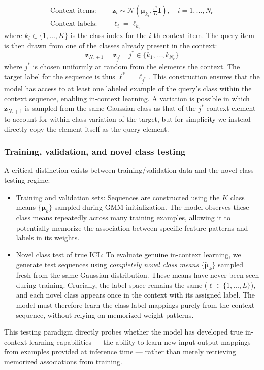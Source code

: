 \documentclass[%
reprint,
superscriptaddress,
amsmath,amssymb,
aps,
]{revtex4-2}
\newcommand{\bz}{\mathbf{z}}       %
\newcommand{\bmu}{\boldsymbol{\mu}}       %
\begin{document}
\begin{onecolumngrid}
		\begin{align}
			\text{Context items: } &\quad \bz_i \sim \mathcal{N}\left(\bmu_{k_i}, \frac{\epsilon^2}{D}\mathbf{I}\right), \quad i = 1, \ldots, N_\text{c} \\
			\text{Context labels: } &\quad \ell_i = \ell_{k_i}
		\end{align}
		where $k_i \in \{1, \ldots, K\}$ is the class index for the $i$-th context item. The query item is then drawn from one of the classes already present in the context:
		\begin{equation}
			\bz_{N_\text{c}+1} = \bz_{j^*} \quad j^* \in \{k_1, \ldots, k_{N_\text{c}}\}
		\end{equation}
		where $j^*$ is chosen uniformly at random from the elements the context. The target label for the sequence is thus $\ell^* = \ell_{j^*}$. This construction ensures that the model has access to at least one labeled example of the query's class within the context sequence, enabling in-context learning.  A variation is possible in which $\bz_{N_\text{c}+1}$ is sampled from the same Gaussian class as that of the $j^*$ context element to account for within-class variation of the target, but for simplicity we instead directly copy the element itself as the query element.
		
		\subsubsection{Training, validation, and novel class testing}
		
		A critical distinction exists between training/validation data and the novel class testing regime:
		\begin{itemize}
			\item Training and validation sets: Sequences are constructed using the $K$ class means $\{\bmu_k\}$ sampled during GMM initialization. The model observes these class means repeatedly across many training examples, allowing it to potentially memorize the association between specific feature patterns and labels in its weights.
			
			\item Novel class test of true ICL: To evaluate genuine in-context learning, we generate test sequences using \emph{completely novel class means} $\{\tilde{\bmu}_k\}$ sampled fresh from the same Gaussian distribution. These means have never been seen during training. Crucially, the label space remains the same ($\ell \in \{1, \ldots, L\}$), and each novel class appears once in the context with its assigned label. The model must therefore learn the class-label mappings purely from the context sequence, without relying on memorized weight patterns.
		\end{itemize}
		This testing paradigm directly probes whether the model has developed true in-context learning capabilities — the ability to learn new input-output mappings from examples provided at inference time — rather than merely retrieving memorized associations from training.
		

\end{onecolumngrid}
\end{document}
